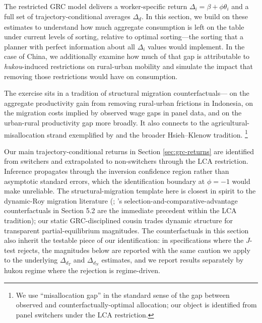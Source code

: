 \documentclass[12pt]{article}
\begin{document}
The restricted GRC model delivers a worker-specific return $\Delta_i = \beta + \phi\theta_i$ and a full set of trajectory-conditional averages $\Delta_{\underline{d}}$.
In this section, we build on these estimates to understand how much aggregate consumption is left on the table under current levels of sorting, relative to optimal sorting---the sorting that a planner with perfect information about all $\Delta_i$ values would implement.
In the case of China, we additionally examine how much of that gap is attributable to \textit{hukou}-induced restrictions on rural-urban mobility and simulate the impact that removing those restrictions would have on consumption.

The exercise sits in a tradition of structural migration counterfactuals---\cite{bryanAggregateProductivityEffects2019} on the aggregate productivity gain from removing rural-urban frictions in Indonesia, \cite{lagakosMigrationCostsObservational2020} on the migration costs implied by observed wage gaps in panel data, and \cite{lagakosUrbanRuralGapsDeveloping2020a} on the urban-rural productivity gap more broadly.
It also connects to the agricultural-misallocation strand exemplified by \cite{adamopoulosMisallocationSelectionProductivity2022} and the broader Hsieh--Klenow tradition.%
\footnote{We use ``misallocation gap'' in the standard sense of the gap between observed and counterfactually-optimal allocation; our object is identified from panel switchers under the LCA restriction.}

Our main trajectory-conditional returns in Section \ref{sec:grc-returns} are identified from switchers and extrapolated to non-switchers through the LCA restriction.
Inference propagates through the inversion confidence region rather than asymptotic standard errors, which the identification boundary at $\phi = -1$ would make unreliable.
The structural-migration template here is closest in spirit to the dynamic-Roy migration literature (\citealt{kennanEffectExpectedIncome2011}; \cite{suriSelectionComparativeAdvantage2011}'s selection-and-comparative-advantage counterfactuals in Section 5.2 are the immediate precedent within the LCA tradition); our static GRC-disciplined cousin trades dynamic structure for transparent partial-equilibrium magnitudes.
The counterfactuals in this section also inherit the testable piece of our identification: in specifications where the $J$-test rejects, the magnitudes below are reported with the same caution we apply to the underlying $\Delta_{d_T}$ and $\Delta_{d_N}$ estimates, and we report results separately by hukou regime where the rejection is regime-driven.
\end{document}
